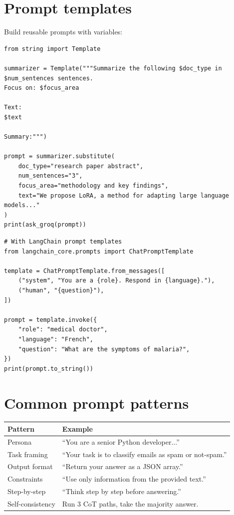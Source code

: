 \section{Prompt templates}

Build reusable prompts with variables:

\begin{verbatim}
from string import Template

summarizer = Template("""Summarize the following $doc_type in $num_sentences sentences.
Focus on: $focus_area

Text:
$text

Summary:""")

prompt = summarizer.substitute(
    doc_type="research paper abstract",
    num_sentences="3",
    focus_area="methodology and key findings",
    text="We propose LoRA, a method for adapting large language models..."
)
print(ask_groq(prompt))
\end{verbatim}

\begin{verbatim}
# With LangChain prompt templates
from langchain_core.prompts import ChatPromptTemplate

template = ChatPromptTemplate.from_messages([
    ("system", "You are a {role}. Respond in {language}."),
    ("human", "{question}"),
])

prompt = template.invoke({
    "role": "medical doctor",
    "language": "French",
    "question": "What are the symptoms of malaria?",
})
print(prompt.to_string())
\end{verbatim}

\section{Common prompt patterns}

\begin{longtable}{p{3.5cm}p{9cm}}
\toprule
\textbf{Pattern} & \textbf{Example} \\
\midrule
Persona & ``You are a senior Python developer...'' \\
Task framing & ``Your task is to classify emails as spam or not-spam.'' \\
Output format & ``Return your answer as a JSON array.'' \\
Constraints & ``Use only information from the provided text.'' \\
Step-by-step & ``Think step by step before answering.'' \\
Self-consistency & Run 3 CoT paths, take the majority answer. \\
\bottomrule
\end{longtable}

